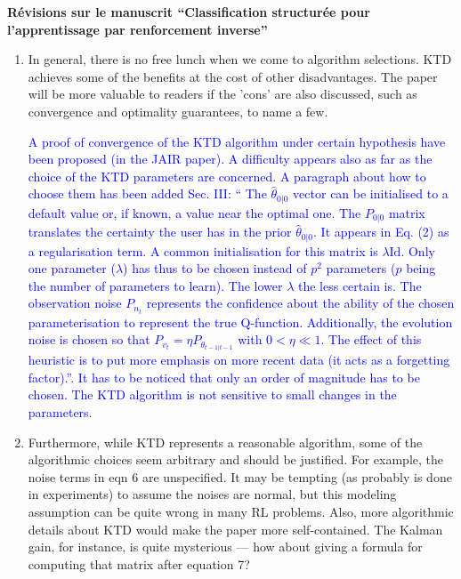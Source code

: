 \documentclass[11pt, a4paper]{letter}
\begin{document}
\begin{letter}{\large \textbf{Révisions sur le manuscrit ``Classification structurée pour l'apprentissage par renforcement inverse''}}
\begin{enumerate}
\textcolor{blue}{The performance of KTD is not effectively better
than those of the other batch algorithms but our goal in this
article is to propose a unique algorithm to solve several learning
issues with comparable performance. Moreover KTD processes samples
only once while other methods process them many times.}

\item In general, there is no free lunch when we come to algorithm
 selections.  KTD achieves some of the benefits at the cost of other
 disadvantages.  The paper will be more valuable to readers if the 'cons'
 are also discussed, such as convergence and optimality guarantees, to name
 a few.

\textcolor{blue}{A proof of convergence of the KTD algorithm under
certain hypothesis have been proposed (in the JAIR paper). A
difficulty appears also as far as the choice of the KTD parameters
are concerned. A paragraph about how to choose them has been added
Sec. III: `` The $\hat{\theta}_{0|0}$ vector can be initialised to a
default value or, if known, a value near the optimal one. The
$P_{0|0}$ matrix translates the certainty the user has in the prior
$\hat{\theta}_{0|0}$. It appears in Eq. (2) as a regularisation
term. A common initialisation for this matrix is $\lambda
\mathrm{Id}$. Only one parameter ($\lambda$) has thus to be chosen
instead of $p^2$ parameters ($p$ being the number of parameters to
learn).  The lower $\lambda$ the less certain is. The observation
noise $P_{n_t}$ represents the confidence about the ability of the
chosen parameterisation to represent the true Q-function.
Additionally, the evolution noise is chosen so that $P_{v_t} = \eta
P_{\theta_{t-1|t-1}}$ with $0 < \eta \ll 1$. The effect of this
heuristic is to put more emphasis on more recent data (it acts as a
forgetting factor).''. It has to be noticed that only an order of
magnitude has to be chosen. The KTD algorithm is not sensitive to
small changes in the parameters.}

\item  Furthermore, while KTD represents a reasonable algorithm, some of the
 algorithmic choices seem arbitrary and should be justified.  For example,
 the noise terms in eqn 6 are unspecified.  It may be tempting (as probably
 is done in experiments) to assume the noises are normal, but this modeling
 assumption can be quite wrong in many RL problems.  Also, more algorithmic
 details about KTD would make the paper more self-contained.  The Kalman
 gain, for instance, is quite mysterious --- how about giving a formula for
 computing that matrix after equation 7?


\end{enumerate}
\end{letter}
\end{document}
